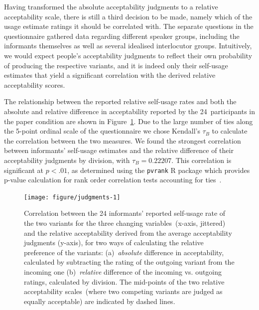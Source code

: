 Having transformed the absolute acceptability judgments to a relative acceptability scale, there is still a third decision to be made, namely which of the usage estimate ratings it should be correlated with. The separate questions in the questionnaire gathered data regarding different speaker groups, including the informants themselves as well as several idealised interlocutor groups. Intuitively, we would expect people's acceptability judgments to reflect their own probability of producing the respective variants, and it is indeed only their self-usage estimates that yield a significant correlation with the derived relative acceptability scores.

The relationship between the reported relative self-usage rates and both the absolute and relative difference in acceptability reported by the 24~participants in the paper condition are shown in Figure~\ref{fig:judgments}. Due to the large number of ties along the 5-point ordinal scale of the questionnaire we chose Kendall's $\tau_B$ to calculate the correlation between the two measures. We found the strongest correlation between informants' self-usage estimates and the relative difference of their acceptability judgments by division, with $\tau_B=0.22207$. This correlation is significant at $p<.01$, as determined using the \texttt{pvrank} R package which provides p-value calculation for rank order correlation tests accounting for ties~\citep{pvrank1.1}. %

\begin{figure}[htbp]

{\centering \texttt{[image: figure/judgments-1]} 

}

\caption[Correlation between the 24 informants' reported self-usage rate of the two variants for the three changing variables and the relative acceptability derived from the average acceptability judgments]{Correlation between the 24 informants' reported self-usage rate of the two variants for the three changing variables~(x-axis, jittered) and the relative acceptability derived from the average acceptability judgments (y-axis), for two ways of calculating the relative preference of the variants: (a)~\emph{absolute} difference in acceptability, calculated by subtracting the rating of the outgoing variant from the incoming one (b)~\emph{relative} difference of the incoming vs. outgoing ratings, calculated by division. The mid-points of the two relative acceptability scales~(where two competing variants are judged as equally acceptable) are indicated by dashed lines.}\label{fig:judgments}
\end{figure}



